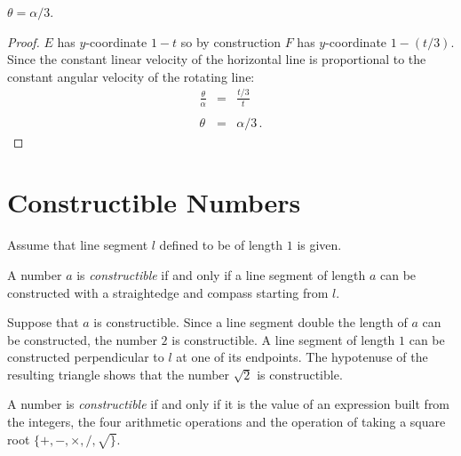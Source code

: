 \begin{theorem}
$\theta = \alpha/3$.
\end{theorem}
\begin{proof}
$E$ has $y$-coordinate $1-t$ so by construction $F$ has $y$-coordinate $1-(t/3)$. Since the constant linear velocity of the horizontal line is proportional to the constant angular velocity of the rotating line:
\begin{eqnarray*}
\frac{\theta}{\alpha} &=& \frac{t/3}{t}\\
&&\\
\theta &=& \alpha/3\,.
\end{eqnarray*}
\end{proof}

\vspace{-3ex}

\section{Constructible Numbers}\label{s.trisect-constructible}

Assume that line segment $l$ defined to be of length $1$ is given.
\begin{definition}
A number $a$ is \emph{constructible} if and only if a line segment of length $a$ can be constructed with a straightedge and compass starting from $l$.
\end{definition}
Suppose that $a$ is constructible. Since a line segment double the length of $a$ can be constructed, the number $2$ is constructible. A line segment of length $1$ can be constructed perpendicular to $l$ at one of its endpoints. The hypotenuse of the resulting triangle shows that the number $\sqrt{2}$ is constructible.

\begin{theorem}\label{thm.trisect-constructible}
A number is \emph{constructible} if and only if it is the value of an expression built from the integers, the four arithmetic operations and the operation of taking a square root
$\{+,-,\times,/,\surd\}$.
\end{theorem}

